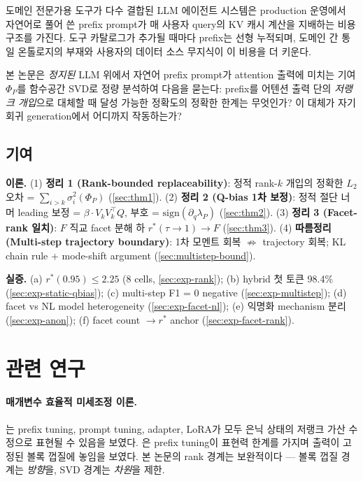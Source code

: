 \documentclass[11pt]{article}
\theoremstyle{definition}
\newcommand{\Phip}{\Phi_P}
\begin{document}
도메인 전문가용 도구가 다수 결합된 LLM 에이전트 시스템은 production 운영에서 자연어로 풀어 쓴 prefix prompt가 매 사용자 query의 KV 캐시 계산을 지배하는 비용 구조를 가진다. 도구 카탈로그가 추가될 때마다 prefix는 선형 누적되며, 도메인 간 통일 온톨로지의 부재와 사용자의 데이터 소스 무지식이 이 비용을 더 키운다.

본 논문은 \emph{정지된} LLM 위에서 자연어 prefix prompt가 attention 출력에 미치는 기여 $\Phip$를 함수공간 SVD로 정량 분석하여 다음을 묻는다: prefix를 어텐션 출력 단의 \emph{저랭크 개입}으로 대체할 때 달성 가능한 정확도의 정확한 한계는 무엇인가? 이 대체가 자기회귀 generation에서 어디까지 작동하는가?

\subsection{기여}

\textbf{이론.} (1) \textbf{정리 1 (Rank-bounded replaceability)}: 정적 rank-$k$ 개입의 정확한 $L_2$ 오차 = $\sum_{i>k}\sigma_i^2(\Phip)$ (\cref{sec:thm1}). (2) \textbf{정리 2 (Q-bias 1차 보정)}: 정적 절단 너머 leading 보정 = $\beta\cdot V_k V_k^\top Q$, 부호 = $\mathrm{sign}(\partial_q\lambda_P)$ (\cref{sec:thm2}). (3) \textbf{정리 3 (Facet-rank 일치)}: $F$ 직교 facet 분해 하 $r^*(\tau\to 1) \to F$ (\cref{sec:thm3}). (4) \textbf{따름정리 (Multi-step trajectory boundary)}: 1차 모멘트 회복 $\not\Rightarrow$ trajectory 회복; KL chain rule + mode-shift argument (\cref{sec:multistep-bound}).

\textbf{실증.} (a) $r^*(0.95) \le 2.25$ (8 cells, \cref{sec:exp-rank}); (b) hybrid 첫 토큰 98.4\% (\cref{sec:exp-static-qbias}); (c) multi-step F1 = 0 negative (\cref{sec:exp-multistep}); (d) facet vs NL model heterogeneity (\cref{sec:exp-facet-nl}); (e) 익명화 mechanism 분리 (\cref{sec:exp-anon}); (f) facet count $\to r^*$ anchor (\cref{sec:exp-facet-rank}).

\section{관련 연구}
\label{sec:related}

\paragraph{매개변수 효율적 미세조정 이론.}
\citet{he2022unified}는 prefix tuning, prompt tuning, adapter, LoRA가 모두 은닉 상태의 저랭크 가산 수정으로 표현될 수 있음을 보였다. \citet{petrov2024prompting}은 prefix tuning이 표현력 한계를 가지며 출력이 고정된 볼록 껍질에 놓임을 보였다. 본 논문의 rank 경계는 보완적이다 --- 볼록 껍질 경계는 \emph{방향}을, SVD 경계는 \emph{차원}을 제한.
\end{document}
